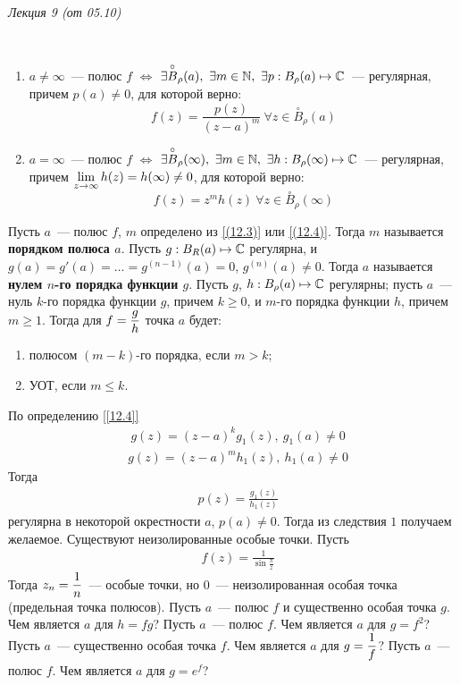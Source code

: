 \begin{flushright}
    \textit{Лекция 9 (от 05.10)}
\end{flushright}
\corollary
~
\begin{enumerate}
    \item $a \neq \infty$~--- полюс $f$ $\Leftrightarrow$ $\exists
    \overset{\circ}{B}_{\rho}(a), \ \exists m \in \mathbb{N}, \ \exists p: B_{\rho}(a)
    \mapsto \mathbb{C}$~--- регулярная, причем $p(a) \neq 0$, для которой верно:
    \begin{equation}\label{(12.3)}
        f(z) = \frac{p(z)}{(z-a)^m} \ \forall z \in \overset{\circ}{B}_\rho(a)
    \end{equation}
    \item $a = \infty$~--- полюс $f$ $\Leftrightarrow$ $\exists
    \overset{\circ}{B}_{\rho}(\infty), \ \exists m \in \mathbb{N}, \ \exists h:
    B_{\rho}(\infty) \mapsto \mathbb{C}$~--- регулярная, причем $\displaystyle\lim_{z \to
      \infty} h(z) = h(\infty) \neq 0$, для которой верно:
    \begin{equation}\label{(12.4)}
        f(z) = z^mh(z) \ \forall z \in \overset{\circ}{B}_\rho(\infty)
    \end{equation}
\end{enumerate}
\Def \label{[12.3]}
Пусть $a$~--- полюс $f$, $m$ определено из \eqref{(12.3)} или
\eqref{(12.4)}. Тогда $m$ называется \textbf{порядком полюса $a$}.
\Def \label{[12.4]}
Пусть $g: B_R(a) \mapsto \mathbb{C}$ регулярна, и $g(a) = g'(a) = \dots = g^{(n-1)}(a)
= 0$, $g^{(n)}(a)\neq 0$. Тогда $a$ называется \textbf{нулем $n$-го порядка
  функции $g$}.
\corollary
Пусть $g$, $h: B_\rho(a) \mapsto \mathbb{C}$ регулярны; пусть $a$~--- нуль $k$-го
порядка функции $g$, причем $k \geq 0$, и $m$-го порядка функции $h$, причем $m
\geq 1$. Тогда для $f = \displaystyle \frac{g}{h}$ точка $a$ будет:
\begin{enumerate}
    \item полюсом $(m-k)$-го порядка, если $m > k$;
    \item УОТ, если $m \leq k$.
\end{enumerate}
\pr
По определению \ref{[12.4]}
\begin{align*}
  & g(z) = (z-a)^kg_1(z), \ g_1(a) \neq 0
\end{align*}
\begin{align*}
  & g(z) = (z-a)^mh_1(z), \ h_1(a) \neq 0
\end{align*}
Тогда
\begin{align*}
  & p(z) = \frac{g_1(z)}{h_1(z)}
\end{align*}
регулярна в некоторой окрестности $a$, $p(a) \neq 0$. Тогда из следствия $1$
получаем желаемое.
\note
Существуют неизолированные особые точки. Пусть
\begin{align*}
  & f(z) = \frac{1}{\sin \frac{\pi}{z}}
\end{align*}
Тогда $z_n = \displaystyle \frac{1}{n}$~--- особые точки, но $0$~---
неизолированная особая точка (предельная точка полюсов).
\Exse
Пусть $a$~--- полюс $f$ и существенно особая точка $g$. Чем является $a$ для $h
= fg$?
\Exse
Пусть $a$~--- полюс $f$. Чем является $a$ для $g= f^2$?
\Exse
Пусть $a$~--- существенно особая точка $f$. Чем является $a$ для $g = \displaystyle
\frac{1}{f}$?
\Exse
Пусть $a$~--- полюс $f$. Чем является $a$ для $g = e^f$?
